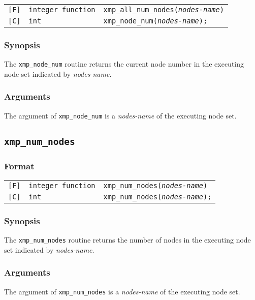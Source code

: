 \begin{tabular}{lll}

\verb![F]!&  {\tt integer function}& {\tt xmp\_all\_num\_nodes({\it nodes-name})}\\

\verb![C]!&  {\tt int}& {\tt xmp\_node\_num({\it nodes-name});}

\end{tabular}

\subsubsection*{Synopsis}
     The {\tt xmp\_node\_num} routine returns the current node number 
     in the executing node set indicated by {\it nodes-name}.

\subsubsection*{Arguments}
     The argument of {\tt xmp\_node\_num} is a {\it nodes-name} of the executing node set.


\vspace{0.3cm}

\subsection{\tt xmp\_num\_nodes}

\subsubsection*{Format}

\begin{tabular}{lll}

\verb![F]!&  {\tt integer function}& {\tt xmp\_num\_nodes({\it nodes-name})}\\

\verb![C]!&  {\tt int}& {\tt xmp\_num\_nodes({\it nodes-name});}

\end{tabular}

\subsubsection*{Synopsis}
     The {\tt xmp\_num\_nodes} routine returns the number of nodes 
     in the executing node set indicated by {\it nodes-name}.

\subsubsection*{Arguments}
    The argument of {\tt xmp\_num\_nodes} is a {\it nodes-name} of the executing node set.


